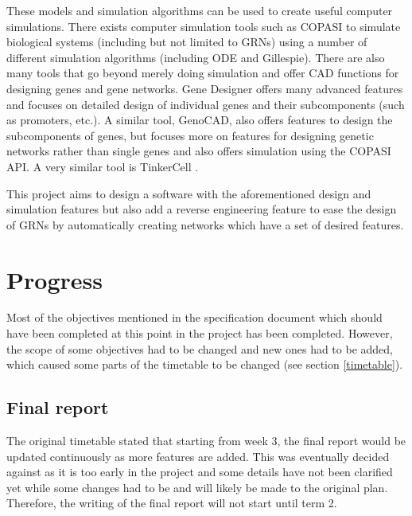 \documentclass{article}
\begin{document}
	\par These models and simulation algorithms can be used to create useful computer simulations. There exists computer simulation tools such as COPASI \cite{copasi} to simulate biological systems (including but not limited to GRNs) using a number of different simulation algorithms (including ODE and Gillespie). There are also many tools that go beyond merely doing simulation and offer CAD functions for designing genes and gene networks. Gene Designer \cite{gene_designer} offers many advanced features and focuses on detailed design of individual genes and their subcomponents (such as promoters, etc.). A similar tool, GenoCAD\cite{genocad}, also offers features to design the subcomponents of genes, but focuses more on features for designing genetic networks rather than single genes and also offers simulation using the COPASI API. A very similar tool is TinkerCell \cite{tinkercell}. 
	\par This project aims to design a software with the aforementioned design and simulation features but also add a reverse engineering feature to ease the design of GRNs by automatically creating networks which have a set of desired features.
	
	\section{Progress}
	
	Most of the objectives mentioned in the specification document which should have been completed at this point in the project has been completed. However, the scope of some objectives had to be changed and new ones had to be added, which caused some parts of the timetable to be changed (see section \ref{timetable}).
	
	\subsection{Final report} 
	The original timetable stated that starting from week 3, the final report would be updated continuously as more features are added. This was eventually decided against as it is too early in the project and some details have not been clarified yet while some changes had to be and will likely be made to the original plan. Therefore, the writing of the final report will not start until term 2.
	
\end{document}
